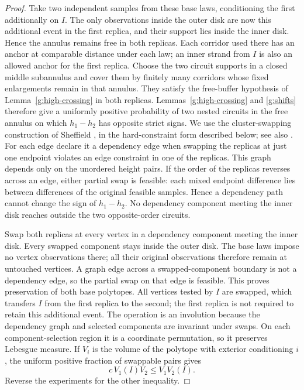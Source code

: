\begin{proof}
Take two independent samples from these base laws, conditioning the
first additionally on \(I\). The only observations inside the outer
disk are now this additional event in the first replica, and their
support lies inside the inner disk. Hence the annulus remains free
in both replicas. Each corridor used there has an anchor at comparable
distance under each law; an inner strand from \(I\) is also an
allowed anchor for the first replica.
Choose the two circuit supports in a closed middle subannulus
and cover them by finitely many corridors whose fixed
enlargements remain in that annulus. They satisfy the
free-buffer hypothesis of Lemma~\ref{g:high-crossing} in
both replicas. Lemmas~\ref{g:high-crossing}
and \ref{g:shifts} therefore give a
uniformly positive probability of two nested circuits in the free
annulus on which \(h_1-h_2\) has opposite strict signs.
We use the cluster-swapping construction of Sheffield
\cite[Chapter~8]{SheffieldSurfaces}, in the hard-constraint form
described below; see also \cite[Section~2]{CAP}.
For each edge declare it a dependency edge when swapping the
replicas at just one endpoint violates an edge constraint in one
of the replicas. This graph depends only on the unordered height
pairs. If the order of the replicas reverses across an edge, either
partial swap is feasible: each mixed endpoint difference lies
between differences of the original feasible samples. Hence a
dependency path cannot change the sign of \(h_1-h_2\).
No dependency component meeting the inner disk reaches outside
the two opposite-order circuits.

Swap both replicas at every vertex in a dependency component
meeting the inner disk. Every swapped component stays inside the
outer disk. The base laws impose no vertex observations there;
all their original observations therefore remain at untouched
vertices. A graph edge across a swapped-component boundary is
not a dependency edge, so the partial swap on that edge is feasible.
This proves preservation of both base polytopes. All vertices
tested by \(I\) are swapped, which transfers \(I\) from the first
replica to the second; the first replica is not required to retain
this additional event. The operation is an involution because the dependency
graph and selected components are invariant under swaps.
On each component-selection region it is a coordinate permutation,
so it preserves Lebesgue measure. If \(V_i\) is the volume of the
polytope with exterior conditioning \(i\), the uniform positive
fraction of swappable pairs gives
\[
 c\,V_1(I)V_2\leq V_1V_2(I).
\]
Reverse the experiments for the other inequality.
\end{proof}

